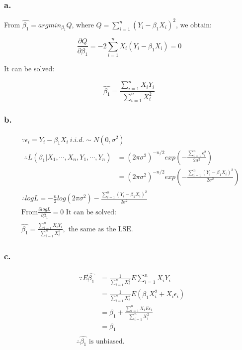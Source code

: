 \documentclass[UTF8]{ctexart}
\begin{document}
\subsubsection{a.}
From $\hat{\beta_1}=argmin_{\beta_1}Q$, where $Q=\sum_{i=1}^n(Y_i-\beta_1X_i)^2$, we obtain:

$$\frac{\partial Q}{\partial\beta_1}=-2\sum_{i=1}^nX_i(Y_i-\beta_1X_i)=0$$

It can be solved:

$$\hat{\beta_1}=\frac{\sum_{i=1}^nX_iY_i}{\sum_{i=1}^nX_i^2}$$

\subsubsection{b.}
\begin{align*}
    &\because \epsilon_i=Y_i-\beta_1X_i\ i.i.d.\sim N(0,\sigma^2)\\
    &\begin{aligned}
        \therefore L(\beta_1|X_1,\cdots,X_n,Y_1,\cdots,Y_n)&=(2\pi\sigma^2)^{-n/2}exp(-\frac{\sum_{i=1}^n\epsilon_i^2}{2\sigma^2})\\
        &=(2\pi\sigma^2)^{-n/2}exp(-\frac{\sum_{i=1}^n(Y_i-\beta_1X_i)^2}{2\sigma^2})
    \end{aligned}\\
    &\therefore logL=-\frac{n}{2}log(2\pi\sigma^2)-\frac{\sum_{i=1}^n(Y_i-\beta_1X_i)^2}{2\sigma^2}\\
    &\text{From}\frac{\partial logL}{\partial \beta_1}=0 \text{ It can be solved:}\\
    &\hat{\beta_1}=\frac{\sum_{i=1}^nX_iY_i}{\sum_{i=1}^nX_i^2},\text{ the same as the LSE.}
\end{align*}

\subsubsection{c.}
\begin{align*}
    &
    \begin{aligned}
        \because E\hat{\beta_1}&=\frac{1}{\sum_{i=1}^nX_i^2}E\sum_{i=1}^nX_iY_i\\
        &=\frac{1}{\sum_{i=1}^nX_i^2}E(\beta_1X_i^2+X_i\epsilon_i)\\
        &=\beta_1+\frac{\sum_{i=1}^nX_iE\epsilon_i}{\sum_{i=1}^nX_i^2}\\
        &=\beta_1
    \end{aligned}\\
    &\therefore \hat{\beta_1}\text{ is unbiased.}
\end{align*}
\end{document}
